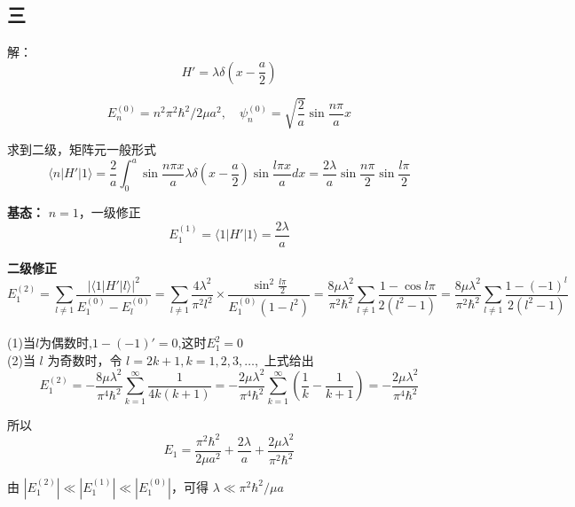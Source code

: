 \subsection{三}
解：\begin{equation}
H' = \lambda \delta \left( x - \frac{a}{2} \right)~
\end{equation}

\begin{equation}
E_n^{(0)} = n^2\pi^2 \hbar^2/2\mu a^2, \quad \psi_n^{(0)} = \sqrt{\frac{2}{a}} \sin \frac{n \pi}{a}x~
\end{equation}

求到二级，矩阵元一般形式
\begin{equation}
\langle n | H' | 1 \rangle = \frac{2}{a} \int_0^a \sin \frac{n \pi x}{a} \lambda \delta \left( x - \frac{a}{2} \right) \sin \frac{l\pi x}{a} dx = \frac{2\lambda}{a} \sin \frac{n \pi}{2} \sin \frac{l\pi}{2}~
\end{equation}

\textbf{基态：} $n=1$，一级修正
\begin{equation}
E_1^{(1)} = \langle 1 | H' | 1 \rangle = \frac{2\lambda}{a}~
\end{equation}

\textbf{二级修正}
\begin{equation}
E_1^{(2)} = \sum_{l \neq 1} \frac{|\langle 1 | H' | l \rangle |^2}{E_1^{(0)} - E_l^{(0)}} = \sum_{l \neq 1} \frac{4\lambda^2}{\pi^2 l^2} \times \frac{\sin^2 \frac{l \pi}{2}}{E_1^{(0)}(1 - l^2)} = \frac{8 \mu \lambda^2}{\pi^2 \hbar^2} \sum_{l \neq 1} \frac{1 - \cos l \pi}{2(l^2 - 1)}
= \frac{8 \mu \lambda^2}{\pi^2 \hbar^2} \sum_{l \neq 1} \frac{1 - (-1)^l}{2(l^2 - 1)}~
\end{equation}\\
(1)当$l$为偶数时,$1-(-1)'=0$,这时$E_1^{2}= 0$\\
(2)当 $l$ 为奇数时，令 $l=2k+1, k=1,2,3,\dots,$ 上式给出
\begin{equation}
E_1^{(2)} = -\frac{8\mu\lambda^2}{\pi^4 \hbar^2} \sum_{k=1}^\infty \frac{1}{4k(k+1)} = -\frac{2 \mu \lambda^2}{\pi^4 \hbar^2} \sum_{k=1}^\infty \left(\frac{1}{k} - \frac{1}{k+1}\right) = -\frac{2 \mu \lambda^2}{\pi^4 \hbar^2}~
\end{equation}

所以
\begin{equation}
E_1 = \frac{\pi^2 \hbar^2}{2\mu a^2} + \frac{2\lambda}{a} + \frac{2 \mu \lambda^2}{\pi^2 \hbar^2}~
\end{equation}

由 $|E_1^{(2)}| \ll |E_1^{(1)}| \ll |E_1^{(0)}|$，可得 $\lambda \ll \pi^2 \hbar^2/\mu a$
